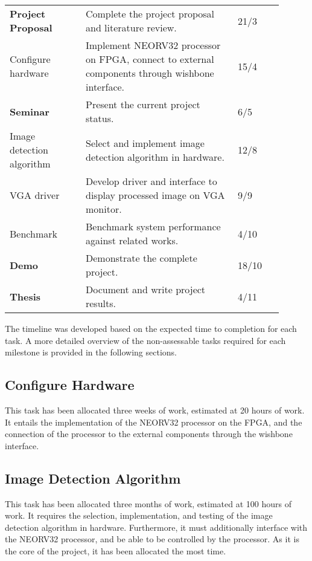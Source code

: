 \begin{center}
\begin{longtable}{p{0.25\linewidth}p{0.5\linewidth}p{0.15\linewidth}}
        \textbf{Project Proposal}	& Complete the project proposal and literature review.                                              & 21/3 \\
        Configure hardware			& Implement NEORV32 processor on FPGA, connect to external components through wishbone interface.   & 15/4 \\
        \textbf{Seminar}            & Present the current project status.                                                               & 6/5 \\
        Image detection algorithm   & Select and implement image detection algorithm in hardware.                                       & 12/8 \\
        VGA driver                  & Develop driver and interface to display processed image on VGA monitor.                           & 9/9 \\
        Benchmark                   & Benchmark system performance against related works.                                               & 4/10 \\
        \textbf{Demo}               & Demonstrate the complete project.                                                                 & 18/10 \\
        \textbf{Thesis}             & Document and write project results.                                                               & 4/11 \\
    \end{longtable}
\end{center}

\nopagebreak

The timeline was developed based on the expected time to completion for each task. A more detailed overview of the non-assessable tasks required for each milestone is provided in the following sections.

\subsection{Configure Hardware}
This task has been allocated three weeks of work, estimated at 20 hours of work. 
It entails the implementation of the NEORV32 processor on the FPGA, and the connection of the processor to the external components through the wishbone interface.

\subsection{Image Detection Algorithm}
This task has been allocated three months of work, estimated at 100 hours of work.
It requires the selection, implementation, and testing of the image detection algorithm in hardware.
Furthermore, it must additionally interface with the NEORV32 processor, and be able to be controlled by the processor.
As it is the core of the project, it has been allocated the most time.

